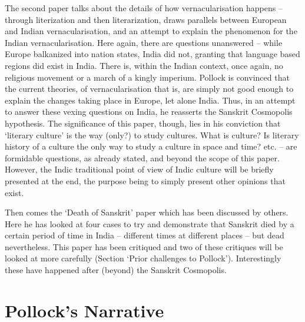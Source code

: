 The second paper talks about the details of how vernacularisation happens – through literization and then literarization, draws parallels between European and Indian vernacularisation, and an attempt to explain the phenomenon for the Indian vernacularisation. Here again, there are questions unanswered – while Europe balkanized into nation states, India did not, granting that language based regions did exist in India. There is, within the Indian context, once again, no religious movement or a march of a kingly imperium. Pollock is convinced that the current theories, of vernacularisation that is, are simply not good enough to explain the changes taking place in Europe, let alone India. Thus, in an attempt to answer these vexing questions on India, he reasserts the Sanskrit Cosmopolis hypothesis. The significance of this paper, though, lies in his conviction that ‘literary culture’ is the way (only?) to study cultures. What is culture? Is literary history of a culture the only way to study a culture in space and time? etc. – are formidable questions, as already stated, and beyond the scope of this paper. However, the Indic traditional point of view of Indic culture will be briefly presented at the end, the purpose being to simply present other opinions that exist.

Then comes the ‘Death of Sanskrit’ paper which has been discussed by others. Here he has looked at four cases to try and demonstrate that Sanskrit died by a certain period of time in India – different times at different places – but dead nevertheless. This paper has been critiqued and two of these critiques will be looked at more carefully (Section ‘Prior challenges to Pollock’). Interestingly these have happened after (beyond) the Sanskrit Cosmopolis.


\section*{Pollock’s Narrative}

